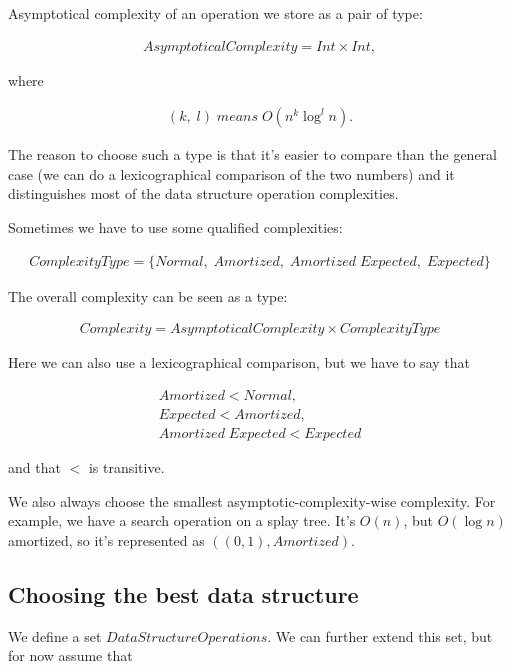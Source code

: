 \documentclass[11pt]{article}
\begin{document}
		Asymptotical complexity of an operation we store as a pair of type:

		\begin{eqnarray}
			AsymptoticalComplexity = Int \times Int,
		\end{eqnarray}

		where

		\begin{eqnarray}
			(k, \; l) \; means \; O(n^k \log^l{ n}).
		\end{eqnarray}

		The reason to choose such a type is that it's easier to compare than the general case (we can do a
		lexicographical comparison of the two numbers) and it distinguishes most of the data structure operation
		complexities.

		Sometimes we have to use some qualified complexities:

		\begin{eqnarray}
			ComplexityType = \{ Normal, \; Amortized, \; Amortized \;Expected, \; Expected \}
		\end{eqnarray}

		The overall complexity can be seen as a type:

		\begin{eqnarray}
			Complexity = AsymptoticalComplexity \times ComplexityType
		\end{eqnarray}

		Here we can also use a lexicographical comparison, but we have to say that

		\begin{eqnarray}
			Amortized < Normal,\\
			Expected < Amortized,\\
			Amortized \; Expected < Expected
		\end{eqnarray}

		and that $<$ is transitive.

		We also always choose the smallest asymptotic-complexity-wise complexity.  For example, we have a search
		operation on a splay tree. It's $O(n)$, but $O(\log n)$ amortized, so it's represented as
		$((0,1),Amortized)$.

	\subsection{Choosing the best data structure}

		We define a set $DataStructureOperations$. We can further extend this set, but for now assume that
\end{document}

